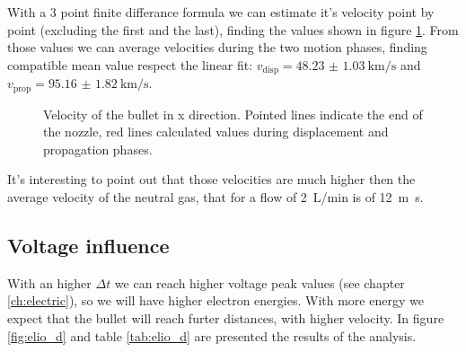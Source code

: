 With a 3 point finite differance formula we can estimate it's velocity point by point (excluding the first and the last), finding the values shown in figure \ref{fig:elio_d035_vx}. From those values we can average velocities during the two motion phases, finding compatible mean value respect the linear fit: $v_{\text{disp}} = \SI{48.23(103)}{\kilo\meter/\second}$ and $v_{\text{prop}} = \SI{95.16(182)}{\kilo\meter/\second}$.
\begin{figure}
 \centering
 \hfill
 \caption{Velocity of the bullet in x direction. Pointed lines indicate the end of the nozzle, red lines calculated values during displacement and propagation phases.}
 \label{fig:elio_d035_vx}
\end{figure}

It's interesting to point out that those velocities are much higher then the average velocity of the neutral gas, that for a flow of \SI{2}{\liter/\minute} is of \SI{12}{\meter\second}.

\subsection{Voltage influence}
With an higher $\Delta t$ we can reach higher voltage peak values (see chapter \ref{ch:electric}), so we will have higher electron energies. With more energy we expect that the bullet will reach furter distances, with higher velocity. In figure \ref{fig:elio_d} and table \ref{tab:elio_d} are presented the results of the analysis.

